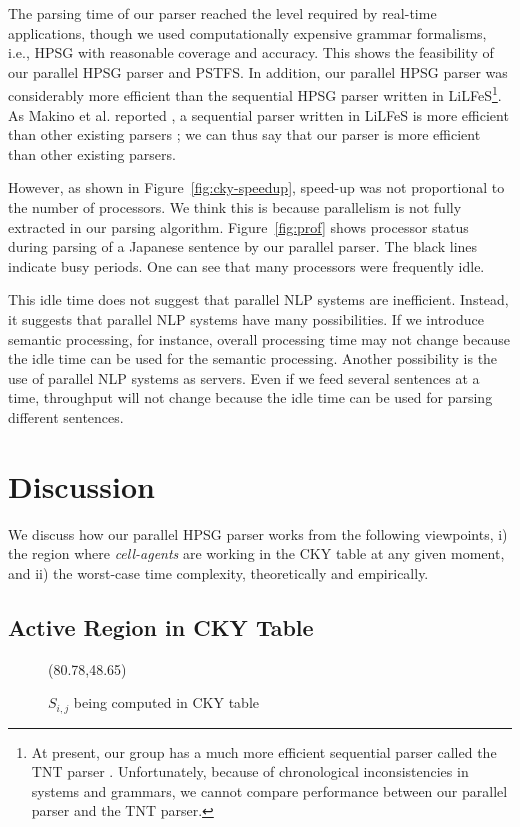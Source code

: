  The parsing time of our parser reached the level required by
real-time applications, though we used computationally expensive
grammar formalisms, i.e., HPSG with reasonable coverage and accuracy.
This shows the feasibility of our parallel HPSG parser and PSTFS.  In
addition, our parallel HPSG parser was considerably more efficient
than the sequential HPSG parser written in LiLFeS\footnote{At present,
our group has a much more efficient sequential parser called the TNT
parser \cite{Nishida99}.  Unfortunately, because of chronological
inconsistencies in systems and grammars, we cannot compare performance
between our parallel parser and the TNT parser.}.  As Makino et
al. reported \cite{Makino98}, a sequential parser written in LiLFeS is
more efficient than other existing parsers \cite{ALE,ProFIT}; we can
thus say that our parser is more efficient than other existing
parsers.

  However, as shown in Figure~\ref{fig:cky-speedup}, speed-up was not
proportional to the number of processors.  We think this is because
parallelism is not fully extracted in our parsing algorithm.
Figure~\ref{fig:prof} shows processor status during parsing of a
Japanese sentence by our parallel parser.  The black lines indicate
busy periods. One can see that many processors were frequently idle.

  This idle time does not suggest that parallel NLP systems are
inefficient.  Instead, it suggests that parallel NLP systems have many
possibilities.  If we introduce semantic processing, for instance,
overall processing time may not change because the idle time can be
used for the semantic processing.  Another possibility is the use of
parallel NLP systems as servers.  Even if we feed several sentences at
a time, throughput will not change because the idle time can be used
for parsing different sentences.


\section{Discussion}
  We discuss how our parallel HPSG parser works from the following
viewpoints, i) the region where {\it cell-agents} are working in the
CKY table at any given moment, and ii) the worst-case time complexity,
theoretically and empirically.

\subsection{Active Region in CKY Table}
\begin{figure}[t]
\begin{center}
\atari(80.78,48.65)
\caption{$S_{i,j}$ being computed in CKY table}
\label{fig:izon2}
\end{center}
\end{figure}

